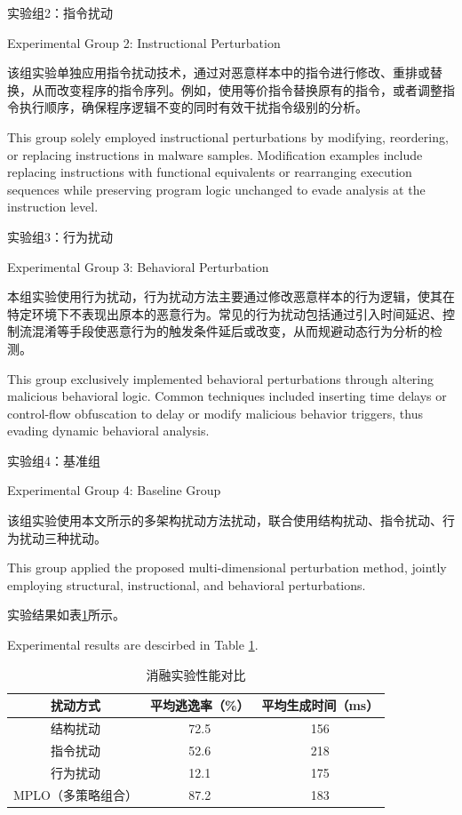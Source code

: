 实验组2：指令扰动

Experimental Group 2: Instructional Perturbation

该组实验单独应用指令扰动技术，通过对恶意样本中的指令进行修改、重排或替换，从而改变程序的指令序列。例如，使用等价指令替换原有的指令，或者调整指令执行顺序，确保程序逻辑不变的同时有效干扰指令级别的分析。

This group solely employed instructional perturbations by modifying, reordering, or replacing instructions in malware samples. Modification examples include replacing instructions with functional equivalents or rearranging execution sequences while preserving program logic unchanged to evade analysis at the instruction level.

实验组3：行为扰动

Experimental Group 3: Behavioral Perturbation

本组实验使用行为扰动，行为扰动方法主要通过修改恶意样本的行为逻辑，使其在特定环境下不表现出原本的恶意行为。常见的行为扰动包括通过引入时间延迟、控制流混淆等手段使恶意行为的触发条件延后或改变，从而规避动态行为分析的检测。

This group exclusively implemented behavioral perturbations through altering malicious behavioral logic. Common techniques included inserting time delays or control-flow obfuscation to delay or modify malicious behavior triggers, thus evading dynamic behavioral analysis.

实验组4：基准组

Experimental Group 4: Baseline Group

该组实验使用本文所示的多架构扰动方法扰动，联合使用结构扰动、指令扰动、行为扰动三种扰动。

This group applied the proposed multi-dimensional perturbation method, jointly employing structural, instructional, and behavioral perturbations.

实验结果如表\ref{tab:5.11}所示。

Experimental results are descirbed in Table \ref{tab:5.11}.

\begin{table}[htbp]
	\centering
	\caption{消融实验性能对比}
	\label{tab:5.11}
	\begin{tabular*}{0.9\textwidth}{@{\extracolsep{\fill}}ccc}
		\toprule
		扰动方式 & 平均逃逸率（\%） & 平均生成时间（ms） \\
		\midrule
		结构扰动 & 72.5 & 156 \\
		指令扰动 & 52.6 & 218 \\
		行为扰动 & 12.1 & 175 \\
		MPLO（多策略组合） & 87.2 & 183 \\
		\bottomrule
	\end{tabular*}
\end{table}


